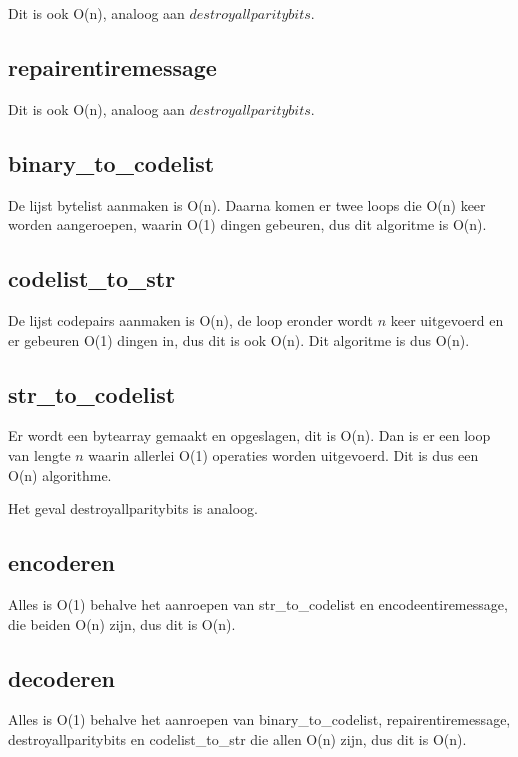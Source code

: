 \documentclass[a4paper]{article}
\begin{document}
Dit is ook O(n), analoog aan $destroyallparitybits$.

\subsection{repairentiremessage}

Dit is ook O(n), analoog aan $destroyallparitybits$.

\subsection{binary\_to\_codelist}

De lijst bytelist aanmaken is O(n). Daarna komen er twee loops die O(n) keer worden aangeroepen, waarin O(1) dingen gebeuren, dus dit algoritme is O(n).

\subsection{codelist\_to\_str}

De lijst codepairs aanmaken is O(n), de loop eronder wordt $n$ keer uitgevoerd en er gebeuren O(1) dingen in, dus dit is ook O(n). Dit algoritme is dus O(n).

\subsection{str\_to\_codelist}

Er wordt een bytearray gemaakt en opgeslagen, dit is O(n). Dan is er een loop van lengte $n$ waarin allerlei O(1) operaties worden uitgevoerd. Dit is dus een O(n) algorithme. 


Het geval destroyallparitybits is analoog.

\subsection{encoderen}

Alles is O(1) behalve het aanroepen van str\_to\_codelist en encodeentiremessage, die beiden O(n) zijn, dus dit is O(n).

\subsection{decoderen}

Alles is O(1) behalve het aanroepen van binary\_to\_codelist, repairentiremessage, destroyallparitybits en codelist\_to\_str die allen O(n) zijn, dus dit is O(n).
\end{document}
